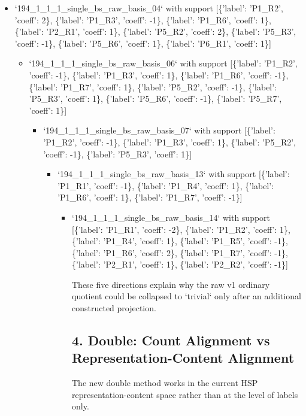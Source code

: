 \documentclass[11pt]{article}
\begin{document}
\begin{itemize}
\begin{itemize}
\begin{itemize}
\begin{itemize}
\begin{itemize}
\begin{itemize}
\item `194\_1\_1\_1\_single\_bs\_raw\_basis\_04` with support [\{'label': 'P1\_R2', 'coeff': 2\}, \{'label': 'P1\_R3', 'coeff': -1\}, \{'label': 'P1\_R6', 'coeff': 1\}, \{'label': 'P2\_R1', 'coeff': 1\}, \{'label': 'P5\_R2', 'coeff': 2\}, \{'label': 'P5\_R3', 'coeff': -1\}, \{'label': 'P5\_R6', 'coeff': 1\}, \{'label': 'P6\_R1', 'coeff': 1\}]
\begin{itemize}
\item `194\_1\_1\_1\_single\_bs\_raw\_basis\_06` with support [\{'label': 'P1\_R2', 'coeff': -1\}, \{'label': 'P1\_R3', 'coeff': 1\}, \{'label': 'P1\_R6', 'coeff': -1\}, \{'label': 'P1\_R7', 'coeff': 1\}, \{'label': 'P5\_R2', 'coeff': -1\}, \{'label': 'P5\_R3', 'coeff': 1\}, \{'label': 'P5\_R6', 'coeff': -1\}, \{'label': 'P5\_R7', 'coeff': 1\}]
\begin{itemize}
\item `194\_1\_1\_1\_single\_bs\_raw\_basis\_07` with support [\{'label': 'P1\_R2', 'coeff': -1\}, \{'label': 'P1\_R3', 'coeff': 1\}, \{'label': 'P5\_R2', 'coeff': -1\}, \{'label': 'P5\_R3', 'coeff': 1\}]
\begin{itemize}
\item `194\_1\_1\_1\_single\_bs\_raw\_basis\_13` with support [\{'label': 'P1\_R1', 'coeff': -1\}, \{'label': 'P1\_R4', 'coeff': 1\}, \{'label': 'P1\_R6', 'coeff': 1\}, \{'label': 'P1\_R7', 'coeff': -1\}]
\begin{itemize}
\item `194\_1\_1\_1\_single\_bs\_raw\_basis\_14` with support [\{'label': 'P1\_R1', 'coeff': -2\}, \{'label': 'P1\_R2', 'coeff': 1\}, \{'label': 'P1\_R4', 'coeff': 1\}, \{'label': 'P1\_R5', 'coeff': -1\}, \{'label': 'P1\_R6', 'coeff': 2\}, \{'label': 'P1\_R7', 'coeff': -1\}, \{'label': 'P2\_R1', 'coeff': 1\}, \{'label': 'P2\_R2', 'coeff': -1\}]

        These five directions explain why the raw v1 ordinary quotient could be collapsed to `trivial` only after an additional constructed projection.

\subsection*{4. Double: Count Alignment vs Representation-Content Alignment}

        The new double method works in the current HSP representation-content space rather than at the level of labels only.


\end{itemize}
\end{itemize}
\end{itemize}
\end{itemize}
\end{itemize}
\end{itemize}
\end{itemize}
\end{itemize}
\end{itemize}
\end{itemize}
\end{document}
